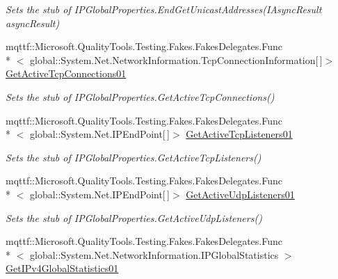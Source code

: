 \begin{DoxyCompactItemize}
\begin{DoxyCompactList}\small\item\em Sets the stub of I\-P\-Global\-Properties.\-End\-Get\-Unicast\-Addresses(\-I\-Async\-Result async\-Result)\end{DoxyCompactList}\item 
mqttf\-::\-Microsoft.\-Quality\-Tools.\-Testing.\-Fakes.\-Fakes\-Delegates.\-Func\\*
$<$ global\-::\-System.\-Net.\-Network\-Information.\-Tcp\-Connection\-Information\mbox{[}$\,$\mbox{]}$>$ \hyperlink{class_system_1_1_net_1_1_network_information_1_1_fakes_1_1_stub_i_p_global_properties_a3ee9f4deb6705ae6f4d47b9667309714}{Get\-Active\-Tcp\-Connections01}
\begin{DoxyCompactList}\small\item\em Sets the stub of I\-P\-Global\-Properties.\-Get\-Active\-Tcp\-Connections()\end{DoxyCompactList}\item 
mqttf\-::\-Microsoft.\-Quality\-Tools.\-Testing.\-Fakes.\-Fakes\-Delegates.\-Func\\*
$<$ global\-::\-System.\-Net.\-I\-P\-End\-Point\mbox{[}$\,$\mbox{]}$>$ \hyperlink{class_system_1_1_net_1_1_network_information_1_1_fakes_1_1_stub_i_p_global_properties_a4c55787049a7c203a8c4e41a5fc292a0}{Get\-Active\-Tcp\-Listeners01}
\begin{DoxyCompactList}\small\item\em Sets the stub of I\-P\-Global\-Properties.\-Get\-Active\-Tcp\-Listeners()\end{DoxyCompactList}\item 
mqttf\-::\-Microsoft.\-Quality\-Tools.\-Testing.\-Fakes.\-Fakes\-Delegates.\-Func\\*
$<$ global\-::\-System.\-Net.\-I\-P\-End\-Point\mbox{[}$\,$\mbox{]}$>$ \hyperlink{class_system_1_1_net_1_1_network_information_1_1_fakes_1_1_stub_i_p_global_properties_a17494b209a2301c574be207c621d74ce}{Get\-Active\-Udp\-Listeners01}
\begin{DoxyCompactList}\small\item\em Sets the stub of I\-P\-Global\-Properties.\-Get\-Active\-Udp\-Listeners()\end{DoxyCompactList}\item 
mqttf\-::\-Microsoft.\-Quality\-Tools.\-Testing.\-Fakes.\-Fakes\-Delegates.\-Func\\*
$<$ global\-::\-System.\-Net.\-Network\-Information.\-I\-P\-Global\-Statistics $>$ \hyperlink{class_system_1_1_net_1_1_network_information_1_1_fakes_1_1_stub_i_p_global_properties_a5ef6f787cb61cb5d3e92db2772de7e8a}{Get\-I\-Pv4\-Global\-Statistics01}

\end{DoxyCompactItemize}
